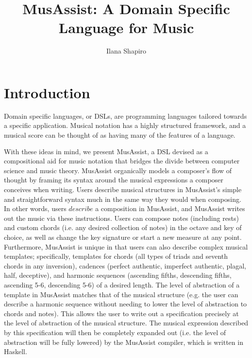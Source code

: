 \documentclass{report}
\title{MusAssist: A Domain Specific Language for Music }
\author{Ilana Shapiro}
\begin{document}
\maketitle

\tableofcontents

\chapter{Introduction}

Domain specific languages, or DSLs, are programming languages tailored towards a specific application. Musical notation has a highly structured framework, and a musical score can be thought of as having many of the features of a language. 

With these ideas in mind, we present MusAssist, a DSL devised as a compositional aid for music notation that bridges the divide between computer science and music theory. MusAssist organically models a composer's flow of thought by framing its syntax around the musical expressions a composer conceives when writing. Users describe musical structures in MusAssist's simple and straightforward syntax much in the same way they would when composing. In other words, users $describe$ a composition in MusAssist, and MusAssist writes out the music via these instructions. Users can compose notes (including rests) and custom chords (i.e. any desired collection of notes) in the octave and key of choice, as well as change the key signature or start a new measure at any point. Furthermore, MusAssist is unique in that users can also describe complex musical templates; specifically, templates for chords (all types of triads and seventh chords in any inversion), cadences (perfect authentic, imperfect authentic, plagal, half, deceptive), and harmonic sequences (ascending fifths, descending fifths, ascending 5-6, descending 5-6) of a desired length. The level of abstraction of a template in MusAssist matches that of the musical structure (e.g. the user can describe a harmonic sequence without needing to lower the level of abstraction to chords and notes). This allows the user to write out a specification precisely at the level of abstraction of the musical structure. The musical expression described by this specification will then be completely expanded out (i.e. the level of abstraction will be fully lowered) by the MusAssist compiler, which is written in Haskell.
\end{document}
